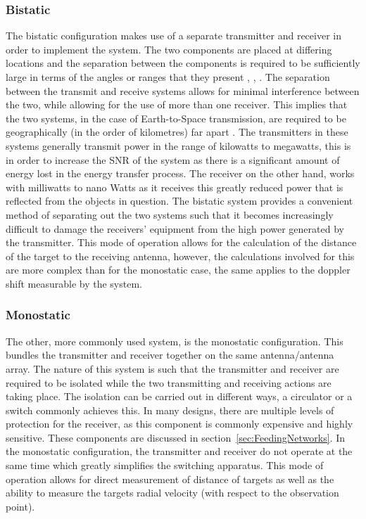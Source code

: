 \documentclass[11pt]{witseiepaper}
\begin{document}
\begin{bibunit}[witseie]
\subsubsection{Bistatic} \label{sec:Bistatic}
The bistatic configuration makes use of a separate transmitter and receiver in order to implement the system. The two components are placed at differing locations and the separation between the components is required to be sufficiently large in terms of the angles or ranges that they present \cite{OrbitDetermination}, \cite[p.~5]{technicalReportSpaceDebris}, \cite[p.~3]{elevationLoss}. The separation between the transmit and receive systems allows for minimal interference between the two, while allowing for the use of more than one receiver.
This implies that the two systems, in the case of Earth-to-Space transmission, are required to be geographically (in the order of kilometres) far apart \cite{bistaticNato}.
The transmitters in these systems generally transmit power in the range of kilowatts to megawatts, this is in order to increase the SNR of the system as there is a significant amount of energy lost in the energy transfer process. The receiver on the other hand, works with milliwatts to nano Watts as it receives this greatly reduced power that is reflected from the objects in question. The bistatic system provides a convenient method of separating out the two systems such that it becomes increasingly difficult to damage the receivers' equipment from the high power generated by the transmitter.
This mode of operation allows for the calculation of the distance of the target to the receiving antenna, however, the calculations involved for this are more complex than for the monostatic case, the same applies to the doppler shift measurable by the system.

\subsubsection{Monostatic} \label{sec:Monostatic}

The other, more commonly used system, is the monostatic configuration. This bundles the transmitter and receiver together on the same antenna/antenna array. The nature of this system is such that the transmitter and receiver are required to be isolated while the two transmitting and receiving actions are taking place. The isolation can be carried out in different ways, a circulator or a switch commonly achieves this. In many designs, there are multiple levels of protection for the receiver, as this component is commonly expensive and highly sensitive. These components are discussed in section~\ref{sec:FeedingNetworks}. In the monostatic configuration, the transmitter and receiver do not operate at the same time which greatly simplifies the switching apparatus.
This mode of operation allows for direct measurement of distance of targets as well as the ability to measure the targets radial velocity (with respect to the observation point).


\end{bibunit}
\end{document}
